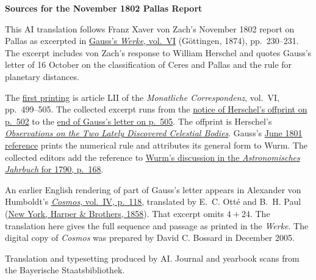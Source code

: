 \clearpage\thispagestyle{empty}
\begin{center}\textbf{Sources for the November 1802 Pallas Report}\end{center}
\noindent This AI translation follows Franz Xaver von Zach’s November 1802 report on Pallas as excerpted in \href{https://gdz.sub.uni-goettingen.de/id/PPN236007467}{Gauss’s \textit{Werke}, vol.~VI} (Göttingen, 1874), pp.~230--231. The excerpt includes von Zach’s response to William Herschel and quotes Gauss’s letter of 16 October on the classification of Ceres and Pallas and the rule for planetary distances.
\par\smallskip\noindent The \href{https://api.digitale-sammlungen.de/iiif/image/v2/bsb10538598_00513/full/1450,/0/default.jpg}{first printing} is article LII of the \textit{Monatliche Correspondenz}, vol.~VI, pp.~499--505. The collected excerpt runs from the \href{https://api.digitale-sammlungen.de/iiif/image/v2/bsb10538598_00516/full/1450,/0/default.jpg}{notice of Herschel’s offprint on p.~502} to the \href{https://api.digitale-sammlungen.de/iiif/image/v2/bsb10538598_00519/full/1450,/0/default.jpg}{end of Gauss’s letter on p.~505}. The offprint is Herschel’s \href{https://doi.org/10.1098/rstl.1802.0010}{\textit{Observations on the Two Lately Discovered Celestial Bodies}}. Gauss’s \href{https://api.digitale-sammlungen.de/iiif/image/v2/bsb10538595_00604/full/1450,/0/default.jpg}{June 1801 reference} prints the numerical rule and attributes its general form to Wurm. The collected editors add the reference to \href{https://api.digitale-sammlungen.de/iiif/image/v2/bsb10538319_00180/full/1450,/0/default.jpg}{Wurm’s discussion in the \textit{Astronomisches Jahrbuch} for 1790, p.~168}.
\par\smallskip\noindent An earlier English rendering of part of Gauss’s letter appears in Alexander von Humboldt’s \href{https://www.geology.19thcenturyscience.org/books/1858-Humboldt-Cosmos/Vol-IV/PDFpages/1858-Humboldt-Cosmos-IV-0118.pdf}{\textit{Cosmos}, vol.~IV, p.~118}, translated by E.~C. Otté and B.~H. Paul (\href{https://www.geology.19thcenturyscience.org/books/1858-Humboldt-Cosmos/Vol-IV/PDFpages/1858-Humboldt-Cosmos-IV-0002.pdf}{New York, Harper \& Brothers, 1858}). That excerpt omits \(4+24\). The translation here gives the full sequence and passage as printed in the \textit{Werke}. The digital copy of \textit{Cosmos} was prepared by David C. Bossard in December 2005.
\par\smallskip\noindent Translation and typesetting produced by AI. Journal and yearbook scans from the Bayerische Staatsbibliothek.
\clearpage

